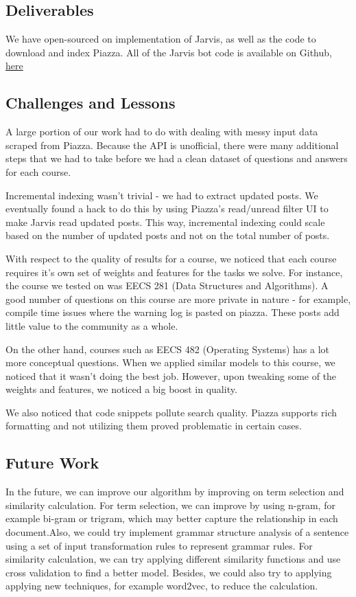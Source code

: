 \documentclass[sigconf]{acmart}
\begin{document}
\subsection{Deliverables}
We have open-sourced on implementation of Jarvis, as well as the code to download and index Piazza. All of the Jarvis bot code is available on Github, \href{https://github.com/pranavr93/piazza_bot}{here}

\subsection{Challenges and Lessons}
A large portion of our work had to do with dealing with messy input data scraped from Piazza. Because the API is unofficial, there were many additional steps that we had to take before we had a clean dataset of questions and answers for each course. 

Incremental indexing wasn't trivial - we had to extract updated posts. We eventually found a hack to do this by using Piazza's read/unread filter UI to make Jarvis read updated posts. This way, incremental indexing could scale based on the number of updated posts and not on the total number of posts.

With respect to the quality of results for a course, we noticed that each course requires it's own set of weights and features for the tasks we solve. For instance, the course we tested on was EECS 281 (Data Structures and Algorithms). A good number of questions on this course are more private in nature - for example, compile time issues where the warning log is pasted on piazza. These posts add little value to the community as a whole.

On the other hand, courses such as EECS 482 (Operating Systems) has a lot more conceptual questions. When we applied similar models to this course, we noticed that it wasn't doing the best job. However, upon tweaking some of the weights and features, we noticed a big boost in quality.

We also noticed that code snippets pollute search quality. Piazza supports rich formatting and not utilizing them proved problematic in certain cases.


\subsection{Future Work}
In the future, we can improve our algorithm by improving on term selection and similarity calculation. For term selection, we can improve by using n-gram, for example bi-gram or trigram, which may better capture the relationship in each document.Also, we could try implement  grammar structure analysis of a sentence using a set of input transformation rules to represent grammar rules. For similarity calculation, we can try applying different similarity functions and use cross validation to find a better model. Besides, we could also try to applying applying new techniques, for example word2vec, to reduce the calculation.
\end{document}
